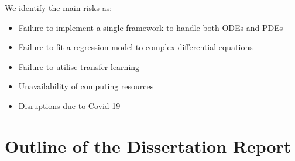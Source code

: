 \documentclass{article}
\begin{document}
We identify the main risks as:

\begin{itemize}
    \item Failure to implement a single framework to handle both ODEs and PDEs
    \item Failure to fit a regression model to complex differential equations
    \item Failure to utilise transfer learning
    \item Unavailability of computing resources
    \item Disruptions due to Covid-19
\end{itemize}

\section{Outline of the Dissertation Report}
\end{document}
